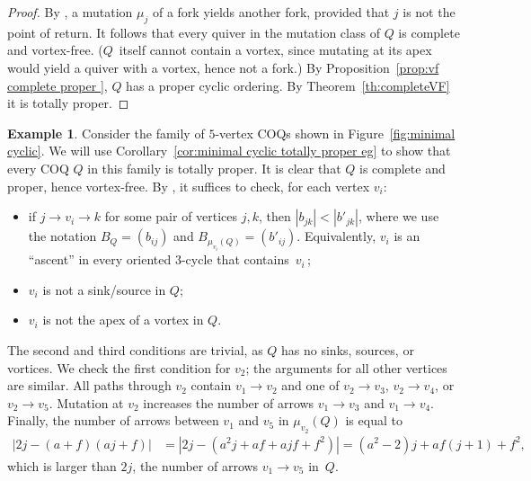 \documentclass[11pt, letterpaper]{amsart}
\theoremstyle{definition}
\newtheorem{example}[theorem]{Example}
\numberwithin{equation}{section}
\begin{document}
\begin{proof}
By \cite[Lemma~2.5]{Warkentin}, a mutation $\mu_j$ of a fork yields another fork, provided that $j$ is not the point of return.
It follows that every quiver in the mutation class of $Q$ is complete and vortex-free. 
($Q$~itself cannot contain a vortex, since mutating at its apex would yield a quiver with a vortex, hence not a fork.)
By Proposition~\ref{prop:vf complete proper }, $Q$ has a proper cyclic ordering. 
By Theorem~\ref{th:completeVF} it is totally proper.
\end{proof}

\begin{example}
\label{eg:minimal cyclic}
Consider the family of $5$-vertex COQs shown in Figure~\ref{fig:minimal cyclic}.
We will use Corollary~\ref{cor:minimal cyclic totally proper eg} to show that 
every COQ $Q$ in this family is totally proper. 
It is clear that $Q$ is complete and proper, hence vortex-free.
By \cite[Proposition~6.13]{LMC}, it suffices to check, for each vertex $v_i$:
\begin{itemize}
\item if $j \rightarrow v_i \rightarrow k$ for some pair of vertices $j,k$, then $|b_{jk}| < |b'_{jk}|$,
where we use the notation $B_Q = (b_{ij})$ and $B_{\mu_{v_i}(Q)} = (b'_{ij})$. 
Equivalently, $v_i$ is an ``ascent'' \cite[Definition~3.3]{LMC} in every oriented $3$-cycle that contains~$v_i\,$; 
\item $v_i$ is not a sink/source in $Q$;
\item $v_i$ is not the apex of a vortex in $Q$.
\end{itemize}
The second and third conditions are trivial, as $Q$ has no sinks, sources, or vortices.
We check the first condition for $v_2$; the arguments for all other vertices are similar.
All paths through $v_2$ contain $v_1 \rightarrow v_2$ and one of $v_2 \rightarrow v_3$, $v_2 \rightarrow v_4$, or $v_2 \rightarrow v_5$.
Mutation at $v_2$ increases the number of arrows $v_1\rightarrow v_3$ and $v_1\rightarrow v_4$.
Finally, the number of arrows between $v_1$ and $v_5$ in $\mu_{v_2}(Q)$ is equal to 
\begin{align*}
|2j - (a+f) (aj+f)| &= |2j - (a^2 j + af + ajf + f^2)| = (a^2 - 2) j + af(j+1) + f^2,
\end{align*}
which is larger than $2j$, the number of arrows $v_1\rightarrow v_5$ in~$Q$.
\end{example}
\end{document}
